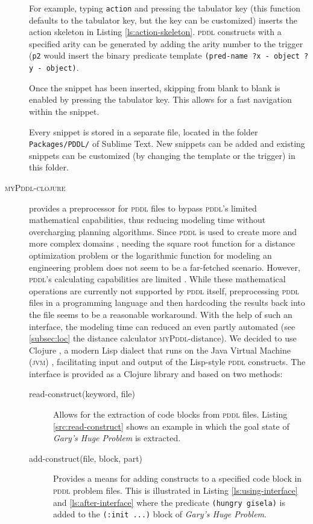 \documentclass[runningheads]{llncs}
\newcommand{\mypddl}{\textsc{myPddl}\xspace}
\newcommand{\mypddlclojure}{\textsc{myPddl-clojure}\xspace}
\newcommand{\pddl}{\textsc{pddl}\xspace}
\begin{document}
\begin{description}
\begin{table}[htb]
\end{table}

For example, typing \texttt{action} and pressing the tabulator key (this
function defaults to the tabulator key, but the key can be customized)
inserts the action skeleton in Listing \ref{ls:action-skeleton}. \pddl
constructs with a specified arity can be generated by adding the arity
number to the trigger (\texttt{p2} would insert the binary predicate
template \texttt{(pred-name~?x~-~object~?y~-~object)}.

Once the snippet has been inserted, skipping from blank to blank is
enabled by pressing the tabulator key. This allows for a fast
navigation within the snippet.

Every snippet is stored in a separate file, located in the folder
\texttt{Packages/PDDL/} of Sublime Text. New snippets can be added and
existing snippets can be customized (by changing the template or the
trigger) in this folder.

\item[\mypddlclojure] provides a preprocessor for \pddl files to
  bypass \pddl's limited mathematical capabilities, thus reducing
  modeling time without overcharging planning algorithms. Since \pddl
  is used to create more and more complex domains
  \cite{goldman2012type,guerin2012academic}, needing the square root
  function for a distance optimization problem or the logarithmic
  function for modeling an engineering problem does not seem to be a
  far-fetched scenario. However, \pddl's calculating capabilities are
  limited \cite{parkinson2012increasing}. While these mathematical
  operations are currently not supported by \pddl itself,
  preprocessing \pddl files in a programming language and then
  hardcoding the results back into the file seems to be a reasonable
  workaround. With the help of such an interface, the modeling time
  can reduced an even partly automated (see \ref{subsec:loc} the
  distance calculator \mypddl-distance).  We decided to use Clojure
  \cite{hickey2008clojure}, a modern Lisp dialect that runs on the
  Java Virtual Machine (\textsc{jvm}) \cite{lindholm2014java},
  facilitating input and output of the Lisp-style \pddl
  constructs. The interface is provided as a Clojure library and based
  on two methods:
\begin{description}
\item[{read-construct(keyword, file)}] Allows for the extraction of
  code blocks from \pddl files. Listing \ref{src:read-construct} shows
  an example in which the goal state of \emph{Gary's Huge Problem} is
  extracted.
\end{description}
\begin{description}
\item[{add-construct(file, block, part)}] Provides a means for adding
constructs to a specified code block in \pddl problem files. This
is illustrated in Listing \ref{ls:using-interface} and
\ref{ls:after-interface} where the predicate \texttt{(hungry gisela)} is
added to the \texttt{(:init~...)} block of \emph{Gary's Huge Problem}.
\end{description}



\end{description}
\end{document}
